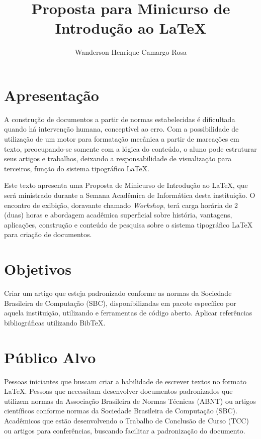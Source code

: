 \documentclass{article}
\title{Proposta para Minicurso de Introdução ao LaTeX}
\author{Wanderson Henrique Camargo Rosa}
\begin{document}
\maketitle{}

\section{Apresentação}
\label{sec:apresentacao}

A construção de documentos a partir de normas estabelecidas é dificultada quando
há intervenção humana, conceptível ao erro. Com a possibilidade de utilização de
um motor para formatação mecânica a partir de marcações em texto, preocupando-se
somente com a lógica do conteúdo, o aluno pode estruturar seus artigos e
trabalhos, deixando a responsabilidade de visualização para terceiros, função do
sistema tipográfico \LaTeX{}.

Este texto apresenta uma Proposta de Minicurso de Introdução ao \LaTeX{}, que
será ministrado durante a Semana Acadêmica de Informática desta instituição. O
encontro de exibição, doravante chamado \emph{Workshop}, terá carga horária de 2
(duas) horas e abordagem acadêmica superficial sobre história, vantagens,
aplicações, construção e conteúdo de pesquisa sobre o sistema tipográfico
\LaTeX{} para criação de documentos.

\section{Objetivos}
\label{sec:objetivos}

Criar um artigo que esteja padronizado conforme as normas da Sociedade
Brasileira de Computação (SBC), disponibilizadas em pacote específico por aquela
instituição, utilizando \LaTeXe{} e ferramentas de código aberto. Aplicar
referências bibliográficas utilizando Bib\TeX{}.

\section{Público Alvo}
\label{sec:publico-alvo}

Pessoas iniciantes que buscam criar a habilidade de escrever textos no formato
\LaTeX{}. Pessoas que necessitam desenvolver documentos padronizados que
utilizem normas da Associação Brasileira de Normas Técnicas (ABNT) ou artigos
científicos conforme normas da Sociedade Brasileira de Computação (SBC).
Acadêmicos que estão desenvolvendo o Trabalho de Conclusão de Curso (TCC) ou
artigos para conferências, buscando facilitar a padronização do documento.
\end{document}
